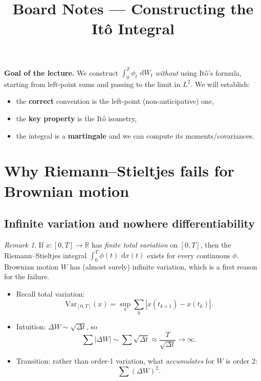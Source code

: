 \documentclass[11pt]{article}
\title{Board Notes --- Constructing the It\^o Integral}
\author{}
\date{}
\newcommand{\R}{\mathbb{R}}
\newcommand{\1}{\mathbf{1}}
\newcommand{\dd}{\,\mathrm{d}}
\numberwithin{equation}{section}
\theoremstyle{plain}
\theoremstyle{definition}
\theoremstyle{remark}
\newtheorem{remark}[theorem]{Remark}
\begin{document}
\maketitle
\vspace{-1em}

\noindent\textbf{Goal of the lecture.}
We construct $\int_0^T \phi_t\,\dd W_t$ \emph{without} using It\^o's formula,
starting from left-point sums and passing to the limit in $L^2$.
We will establish:
\begin{itemize}[leftmargin=2em]
  \item the \textbf{correct} convention is the left-point (non-anticipative) one,
  \item the \textbf{key property} is the It\^o isometry,
  \item the integral is a \textbf{martingale} and we can compute its moments/covariances.
\end{itemize}

\section{Why Riemann--Stieltjes fails for Brownian motion}

\subsection{Infinite variation and nowhere differentiability}

\begin{remark}
If $x:[0,T]\to\R$ has \emph{finite total variation} on $[0,T]$, then the
Riemann--Stieltjes integral $\int_0^T \phi(t)\,\dd x(t)$ exists for every continuous $\phi$.
Brownian motion $W$ has (almost surely) infinite variation, which is a first reason for the failure.
\end{remark}


\begin{itemize}
  \item Recall total variation:
  \[
    \mathrm{Var}_{[0,T]}(x)=\sup_{\pi}\sum_{k}|x(t_{k+1})-x(t_k)|.
  \]
  \item Intuition: $\Delta W \sim \sqrt{\Delta t}$, so
  \[
    \sum |\Delta W|
    \sim \sum \sqrt{\Delta t}
    \approx \frac{T}{\sqrt{\Delta t}}\to\infty.
  \]
  \item Transition: rather than order-1 variation, what \emph{accumulates} for $W$ is order 2:
  \[
    \sum (\Delta W)^2.
  \]
\end{itemize}
\end{document}
